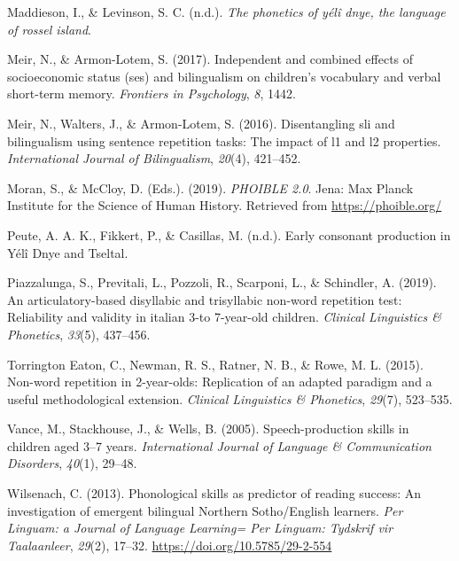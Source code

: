 \documentclass[english,,man,floatsintext]{apa6}
\begin{document}
\leavevmode\hypertarget{ref-maddiesonIPphoneticsYD}{}%
Maddieson, I., \& Levinson, S. C. (n.d.). \emph{The phonetics of yélî dnye, the language of rossel island}.

\leavevmode\hypertarget{ref-meir2017independent}{}%
Meir, N., \& Armon-Lotem, S. (2017). Independent and combined effects of socioeconomic status (ses) and bilingualism on children's vocabulary and verbal short-term memory. \emph{Frontiers in Psychology}, \emph{8}, 1442.

\leavevmode\hypertarget{ref-meir2016disentangling}{}%
Meir, N., Walters, J., \& Armon-Lotem, S. (2016). Disentangling sli and bilingualism using sentence repetition tasks: The impact of l1 and l2 properties. \emph{International Journal of Bilingualism}, \emph{20}(4), 421--452.

\leavevmode\hypertarget{ref-phoible}{}%
Moran, S., \& McCloy, D. (Eds.). (2019). \emph{PHOIBLE 2.0}. Jena: Max Planck Institute for the Science of Human History. Retrieved from \url{https://phoible.org/}

\leavevmode\hypertarget{ref-peuteIPconsonants}{}%
Peute, A. A. K., Fikkert, P., \& Casillas, M. (n.d.). Early consonant production in Yélî Dnye and Tseltal.

\leavevmode\hypertarget{ref-piazzalunga2019articulatory}{}%
Piazzalunga, S., Previtali, L., Pozzoli, R., Scarponi, L., \& Schindler, A. (2019). An articulatory-based disyllabic and trisyllabic non-word repetition test: Reliability and validity in italian 3-to 7-year-old children. \emph{Clinical Linguistics \& Phonetics}, \emph{33}(5), 437--456.

\leavevmode\hypertarget{ref-torrington2015non}{}%
Torrington Eaton, C., Newman, R. S., Ratner, N. B., \& Rowe, M. L. (2015). Non-word repetition in 2-year-olds: Replication of an adapted paradigm and a useful methodological extension. \emph{Clinical Linguistics \& Phonetics}, \emph{29}(7), 523--535.

\leavevmode\hypertarget{ref-vance2005speech}{}%
Vance, M., Stackhouse, J., \& Wells, B. (2005). Speech-production skills in children aged 3--7 years. \emph{International Journal of Language \& Communication Disorders}, \emph{40}(1), 29--48.

\leavevmode\hypertarget{ref-wilsenach2013phonological}{}%
Wilsenach, C. (2013). Phonological skills as predictor of reading success: An investigation of emergent bilingual Northern Sotho/English learners. \emph{Per Linguam: a Journal of Language Learning= Per Linguam: Tydskrif vir Taalaanleer}, \emph{29}(2), 17--32. \url{https://doi.org/10.5785/29-2-554}
\end{document}
